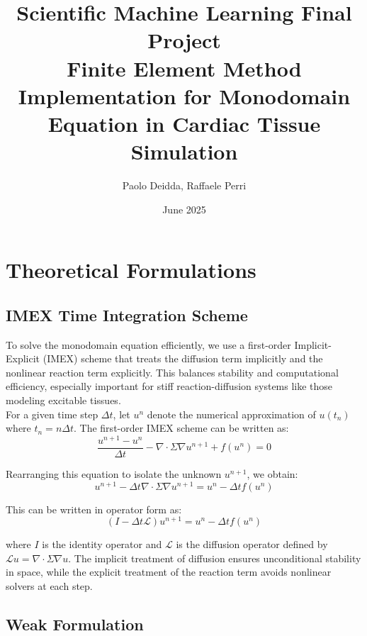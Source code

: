 \documentclass[12pt,a4paper]{article}
\title{\textbf{Scientific Machine Learning Final Project} \\
       \large Finite Element Method Implementation for Monodomain Equation in Cardiac Tissue Simulation}
\author{Paolo Deidda, Raffaele Perri}
\date{June 2025}
\begin{document}
\maketitle
\tableofcontents
\newpage

\section{Theoretical Formulations}

\subsection{IMEX Time Integration Scheme}

To solve the monodomain equation efficiently, we use a first-order Implicit-Explicit (IMEX) scheme that treats the diffusion term implicitly and the nonlinear reaction term explicitly. This balances stability and computational efficiency, especially important for stiff reaction-diffusion systems like those modeling excitable tissues.\\
For a given time step $\Delta t$, let $u^n$ denote the numerical approximation of $u(t_n)$ where $t_n = n\Delta t$. The first-order IMEX scheme can be written as:
\begin{equation}
\frac{u^{n+1} - u^n}{\Delta t} - \nabla \cdot \Sigma \nabla u^{n+1} + f(u^n) = 0
\end{equation}

Rearranging this equation to isolate the unknown $u^{n+1}$, we obtain:
\begin{equation}
u^{n+1} - \Delta t \nabla \cdot \Sigma \nabla u^{n+1} = u^n - \Delta t f(u^n)
\end{equation}

This can be written in operator form as:
\begin{equation}
(I - \Delta t \mathcal{L}) u^{n+1} = u^n - \Delta t f(u^n)
\end{equation}

where $I$ is the identity operator and $\mathcal{L}$ is the diffusion operator defined by $\mathcal{L}u = \nabla \cdot \Sigma \nabla u$.
The implicit treatment of diffusion ensures unconditional stability in space, while the explicit treatment of the reaction term avoids nonlinear solvers at each step.

\subsection{Weak Formulation}
\end{document}
